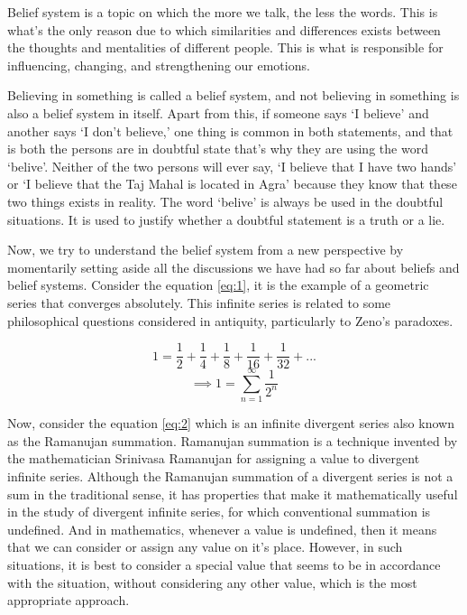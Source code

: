 Belief system is a topic on which the more we talk, the less the words. This is what's the only reason due to which similarities and differences exists between the thoughts and mentalities of different people. This is what is responsible for influencing, changing, and strengthening our emotions.

Believing in something is called a belief system, and not believing in something is also a belief system in itself. Apart from this, if someone says `I believe' and another says `I don't believe,' one thing is common in both statements, and that is both the persons are in doubtful state that's why they are using the word `belive'. Neither of the two persons will ever say, `I believe that I have two hands' or `I believe that the Taj Mahal is located in Agra' because they know that these two things exists in reality. The word `belive' is always be used in the doubtful situations. It is used to justify whether a doubtful statement is a truth or a lie.

Now, we try to understand the belief system from a new perspective by momentarily setting aside all the discussions we have had so far about beliefs and belief systems. Consider the equation \ref{eq:1}, it is the example of a geometric series that converges absolutely. This infinite series is related to some philosophical questions considered in antiquity, particularly to Zeno's paradoxes\cite{enwiki:1123380424}.

\[1 = \dfrac{1}{2} + \dfrac{1}{4} + \dfrac{1}{8} + \dfrac{1}{16} + \dfrac{1}{32} + ...\]
\begin{equation}\label{eq:1}
	\implies\boxed{1 = \sum\limits_{n = 1}^\infty\dfrac{1}{2^n}}
\end{equation}

Now, consider the equation \ref{eq:2} which is an infinite divergent series also known as the Ramanujan summation. Ramanujan summation is a technique invented by the mathematician Srinivasa Ramanujan for assigning a value to divergent infinite series. Although the Ramanujan summation of a divergent series is not a sum in the traditional sense, it has properties that make it mathematically useful in the study of divergent infinite series, for which conventional summation is undefined\cite{enwiki:1148245424}. And in mathematics, whenever a value is undefined, then it means that we can consider or assign any value on it's place. However, in such situations, it is best to consider a special value that seems to be in accordance with the situation, without considering any other value, which is the most appropriate approach.

